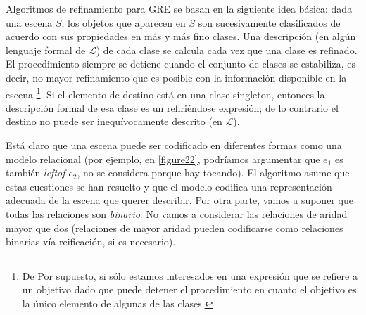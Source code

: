 Algoritmos de refinamiento para GRE se basan en la siguiente idea b\'asica:
dada una escena $S$, los objetos que aparecen en $S$ son sucesivamente
clasificados de acuerdo con sus propiedades en m\'as y m\'as fino
clases. Una descripci\'on (en alg\'un lenguaje formal de $\mathcal{L}$) de cada
clase se calcula cada vez que una clase es refinado. El procedimiento siempre
se detiene cuando el conjunto de clases se estabiliza, es decir, no mayor refinamiento
que es posible con la informaci\'on disponible en la escena \footnote{De
   Por supuesto, si s\'olo estamos interesados en una expresi\'on que se refiere a un
   objetivo dado que puede detener el procedimiento en cuanto el objetivo es la
   \'unico elemento de algunas de las clases.}. Si el elemento de destino est\'a en
una clase singleton, entonces la descripci\'on formal de esa clase es un
refiri\'endose expresi\'on; de lo contrario el destino no puede ser inequ\'{i}vocamente
descrito (en $\mathcal{L}$).


Est\'a claro que una escena puede ser codificado en diferentes formas como una
modelo relacional (por ejemplo, en \ref{figure22}, podr\'{i}amos argumentar que
$e_1$ es tambi\'en \emph{leftof} $e_2$, no se considera porque hay
tocando). El algoritmo asume que estas cuestiones se han resuelto
y que el modelo codifica una representaci\'on adecuada de la escena que
querer describir. Por otra parte, vamos a suponer que todas las relaciones son
\emph{binario}. No vamos a considerar las relaciones de aridad mayor que
dos (relaciones de mayor aridad pueden codificarse como relaciones binarias v\'{i}a
reificaci\'on, si es necesario).



